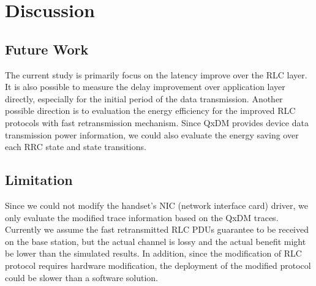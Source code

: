 \section{Discussion}

\subsection{Future Work}
The current study is primarily focus on the latency improve over the RLC layer. It is also possible to measure the delay improvement over application layer directly, especially for the initial period of the data transmission. Another possible direction is to evaluation the energy efficiency for the improved RLC protocols with fast retransmission mechanism. Since QxDM provides device data transmission power information, we could also evaluate the energy saving over each RRC state and state transitions.

\subsection{Limitation}
Since we could not modify the handset's NIC (network interface card) driver, we only evaluate the modified trace information based on the QxDM traces. Currently we assume the fast retransmitted RLC PDUs guarantee to be received on the base station, but the actual channel is lossy and the actual benefit might be lower than the simulated results. In addition, since the modification of RLC protocol requires hardware modification, the deployment of the modified protocol could be slower than a software solution.

\label{sec:disc}


